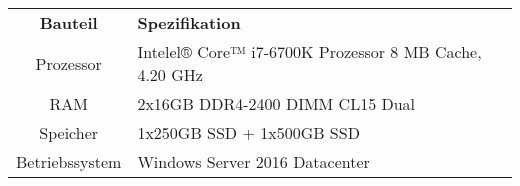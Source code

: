\begin{tabularx}{\textwidth}{cXX}
\rowcolor{heading}\textbf{Bauteil} & \textbf{Spezifikation} \\
Prozessor & Intelel® Core™ i7-6700K Prozessor 8 MB Cache, 4.20 GHz \\ 
\rowcolor{odd} RAM & 2x16GB DDR4-2400 DIMM CL15 Dual \\
Speicher & 1x250GB SSD + 1x500GB SSD \\ 
\rowcolor{odd} Betriebssystem & Windows Server 2016 Datacenter \\
\end{tabularx}
